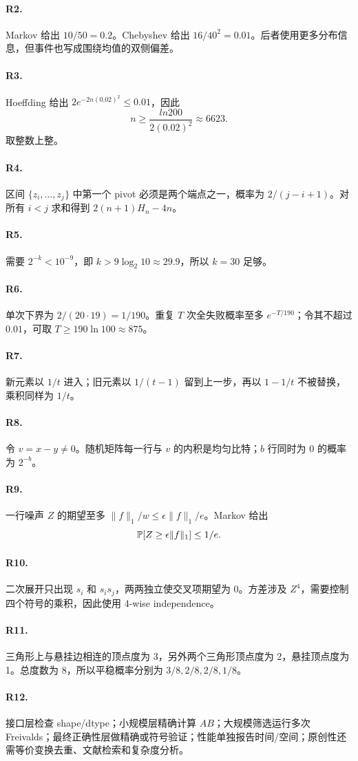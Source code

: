 \paragraph{R2.}
Markov 给出 $10/50=0.2$。Chebyshev 给出 $16/40^2=0.01$。后者使用更多分布信息，但事件也写成围绕均值的双侧偏差。

\paragraph{R3.}
Hoeffding 给出 $2e^{-2n(0.02)^2}\le0.01$，因此
\[
n\ge\frac{ln200}{2(0.02)^2}\approx6623.
\]
取整数上整。

\paragraph{R4.}
区间 $\{z_i,\dots,z_j\}$ 中第一个 pivot 必须是两个端点之一，概率为 $2/(j-i+1)$。对所有 $i<j$ 求和得到 $2(n+1)H_n-4n$。

\paragraph{R5.}
需要 $2^{-k}<10^{-9}$，即 $k>9\log_2 10\approx29.9$，所以 $k=30$ 足够。

\paragraph{R6.}
单次下界为 $2/(20\cdot19)=1/190$。重复 $T$ 次全失败概率至多 $e^{-T/190}$；令其不超过 $0.01$，可取 $T\ge190\ln100\approx875$。

\paragraph{R7.}
新元素以 $1/t$ 进入；旧元素以 $1/(t-1)$ 留到上一步，再以 $1-1/t$ 不被替换，乘积同样为 $1/t$。

\paragraph{R8.}
令 $v=x-y\ne0$。随机矩阵每一行与 $v$ 的内积是均匀比特；$b$ 行同时为 0 的概率为 $2^{-b}$。

\paragraph{R9.}
一行噪声 $Z$ 的期望至多 $\|f\|_1/w\le\epsilon\|f\|_1/e$。Markov 给出
\[
\mathbb{P}[Z\ge\epsilon\|f\|_1]\le1/e.
\]

\paragraph{R10.}
二次展开只出现 $s_i$ 和 $s_is_j$，两两独立使交叉项期望为 0。方差涉及 $Z^4$，需要控制四个符号的乘积，因此使用 4-wise independence。

\paragraph{R11.}
三角形上与悬挂边相连的顶点度为 3，另外两个三角形顶点度为 2，悬挂顶点度为 1。总度数为 8，所以平稳概率分别为 $3/8,2/8,2/8,1/8$。

\paragraph{R12.}
接口层检查 shape/dtype；小规模层精确计算 $AB$；大规模筛选运行多次 Freivalds；最终正确性层做精确或符号验证；性能单独报告时间/空间；原创性还需等价变换去重、文献检索和复杂度分析。
